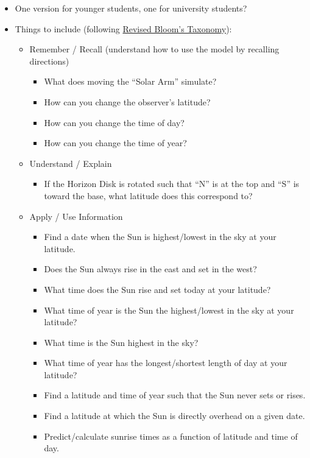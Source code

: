 \documentclass[tikz]{article}
\begin{document}
\begin{itemize}
		\begin{itemize}
			\item One version for younger students, one for university students?
			\item Things to include (following \href{https://cft.vanderbilt.edu/guides-sub-pages/blooms-taxonomy/}{Revised Bloom's Taxonomy}): 
			\begin{itemize}
				\item Remember / Recall (understand how to use the model by recalling directions)
				\begin{itemize}
					\item What does moving the ``Solar Arm'' simulate?
					\item How can you change the observer's latitude? 
					\item How can you change the time of day? 
					\item How can you change the time of year? 
				\end{itemize}
				\item Understand / Explain
				\begin{itemize}
					\item If the Horizon Disk is rotated such that ``N'' is at the top and ``S'' is toward the base, what latitude does this correspond to? 
				\end{itemize}
				\item Apply / Use Information
				\begin{itemize}
					\item Find a date when the Sun is highest/lowest in the sky at your latitude.
					\item Does the Sun always rise in the east and set in the west? 
					\item What time does the Sun rise and set today at your latitude?
					\item What time of year is the Sun the highest/lowest in the sky at your latitude?
					\item What time is the Sun highest in the sky? 
					\item What time of year has the longest/shortest length of day at your latitude?
					\item Find a latitude and time of year such that the Sun never sets or rises.
					\item Find a latitude at which the Sun is directly overhead on a given date.
					\item Predict/calculate sunrise times as a function of latitude and time of day. 

\end{itemize}
\end{itemize}
\end{itemize}
\end{itemize}
\end{document}
